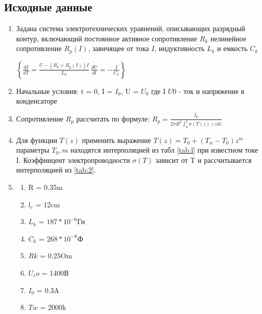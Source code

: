 \documentclass[12pt,a4paper]{scrartcl}
\begin{document}
\subsection{Исходные данные}
\begin{enumerate}
	\item Задана система электротехнических уравнений, описывающих разрядный контур, включающий постоянное активное сопротивление $R_k$ нелинейное сопротивление $R_p(I)$, завичящее от тока $I$, индуктивность $L_k$ и емкость $C_k$
	
	\begin{math}
		\left\{
			\frac{dI}{dT} = \frac{U - (R_k + R_p(I))I}{L_k} \
			\frac{dU}{dt} = - \frac{I}{C_k}
		\right\}
	\end{math}
	
	\item Начальные условия: t = 0, I = $I_0$, U = $U_0$ где I $U0$ - ток и напряжение в конденсаторе
	\item Сопротивление $R_p$ рассчитать по формуле: $R_p = \frac{I_p}{2 \pi R^2 \int_{0}^{1}\sigma(T(z))zdz}$
	\item Для функции $T(z)$ применить выражение $T(z) = T_0 + (T_w - T_0)z^m$ параметры $T_0, m$ находятся интерполяцией из табл \ref{tab:l} при известном токе I.
	Коэффиицент электропроводности $\sigma(T)$ зависит от T и рассчитывается интерполяцией из \ref{tab:2}.
	\item \begin{enumerate}
		\item R = 0.35m
		\item $l_e$ = 12cm
		\item $L_k$ = $187 * 10^{-6}$Гн
		\item $C_k$ = $268 * 10^{-6}$Ф
		\item $Rk$ = 0.25Om
		\item $U_co$ = 1400В
		\item $I_0$ = 0.3A
		\item $Tw$ = 2000k
	\end{enumerate}
\end{enumerate}
	
\end{document}
